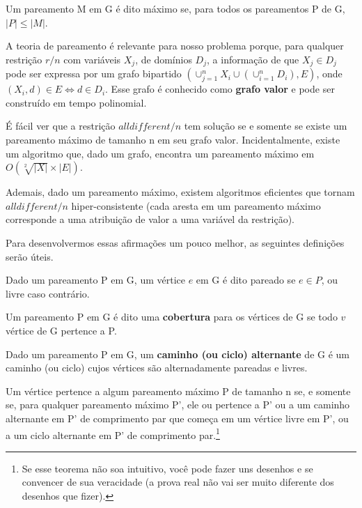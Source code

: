 \documentclass{article}
\begin{document}
\begin{definition}
  Um pareamento M em G é dito máximo se, para todos os pareamentos P de G, $|P| \leq |M|$.
\end{definition}

A teoria de pareamento é relevante para nosso problema porque, para qualquer restrição $r/n$ com variáveis $X_j$, de domínios
$D_j$, a informação de que $X_j \in D_j$ pode ser expressa por um grafo bipartido $(\cup_{j=1}^nX_i\cup(\cup_{i=1}^nD_i),E)$, onde $(X_i,d) \in E \Leftrightarrow d \in D_i$. Esse grafo é conhecido como \textbf{grafo valor} e pode ser construído em tempo polinomial.

É fácil ver que a restrição $alldifferent/n$ tem solução se e somente se existe um pareamento máximo de tamanho n em seu grafo valor. Incidentalmente, existe um algoritmo que, dado um grafo, encontra um pareamento máximo em $O(\sqrt[2]{|X|}\times|E|)$.

Ademais, dado um pareamento máximo, existem algoritmos eficientes que tornam $alldifferent/n$ hiper-consistente (cada aresta em um pareamento máximo corresponde a uma atribuição de valor a uma variável da restrição).

Para desenvolvermos essas afirmações um pouco melhor, as seguintes definições serão úteis.

\begin{definition}
  Dado um pareamento P em G, um vértice $e$ em G é dito pareado se $e\in P$, ou livre caso contrário.
\end{definition}

\begin{definition}
  Um pareamento P em G é dito uma \textbf{cobertura} para os vértices de G se todo $v$ vértice de G pertence a P.
\end{definition}

\begin{definition}
  Dado um pareamento P em G, um \textbf{caminho (ou ciclo) alternante} de G é um caminho (ou ciclo) cujos vértices são alternadamente pareadas e livres.
\end{definition}

\begin{theorem}
  Um vértice pertence a algum pareamento máximo P de tamanho n se, e somente se, para qualquer pareamento máximo P', ele ou pertence a P' ou a um caminho alternante em P' de comprimento par que começa em um vértice livre em P', ou a um ciclo alternante
  em P' de comprimento par.\footnote{Se esse teorema não soa intuitivo, você pode fazer uns desenhos e se convencer de sua veracidade (a prova real não vai ser muito diferente dos desenhos que fizer).}
\end{theorem}
\end{document}

